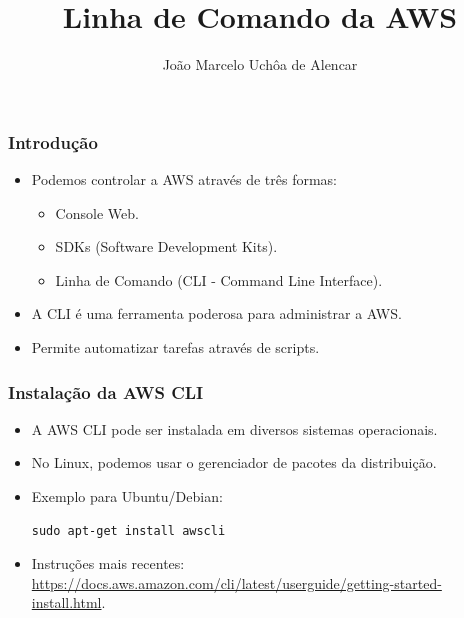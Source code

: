\documentclass{beamer}
\title{Linha de Comando da AWS}
\author[João Marcelo Uchôa de Alencar]{João Marcelo Uchôa de Alencar}
\institute{Universidade Federal do Ceará - Quixadá}
\begin{document}
   \begin{frame}
      \titlepage
   \end{frame}

   \begin{frame}
      \frametitle{Introdução}
      \begin{itemize}
         \item Podemos controlar a AWS através de três formas:
         \begin{itemize}
            \item Console Web.
            \item SDKs (Software Development Kits).
            \item Linha de Comando (CLI - Command Line Interface).
         \end{itemize}
         \item A CLI é uma ferramenta poderosa para administrar a AWS.
         \item Permite automatizar tarefas através de scripts.
      \end{itemize}
   \end{frame}

   \begin{frame}[fragile]
      \frametitle{Instalação da AWS CLI}
      \begin{itemize}
         \item A AWS CLI pode ser instalada em diversos sistemas operacionais.
         \item No Linux, podemos usar o gerenciador de pacotes da distribuição.
         \item Exemplo para Ubuntu/Debian:
         \begin{verbatim}
sudo apt-get install awscli
         \end{verbatim}
         \item Instruções mais recentes: \url{https://docs.aws.amazon.com/cli/latest/userguide/getting-started-install.html}. 
      \end{itemize}
   \end{frame}
\end{document}
